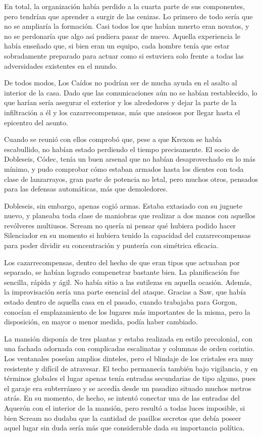 En total, la organización había perdido a la cuarta parte de sus componentes, pero tendrían que aprender a surgir de las cenizas. Lo primero de todo sería que no se ampliaría la formación. Casi todos los que habían muerto eran novatos, y no se perdonaría que algo así pudiera pasar de nuevo. Aquella experiencia le había enseñado que, si bien eran un equipo, cada hombre tenía que estar sobradamente preparado para actuar como si estuviera solo frente a todas las adversidades existentes en el mundo.

De todos modos, Los Caídos no podrían ser de mucha ayuda en el asalto al interior de la casa. Dado que las comunicaciones aún no se habían restablecido, lo que harían sería asegurar el exterior y los alrededores y dejar la parte de la infiltración a él y los cazarrecompensas, más que ansiosos por llegar hasta el epicentro del asunto.

Cuando se reunió con ellos comprobó que, pese a que Krexon se había escabullido, no habían estado perdiendo el tiempo precisamente. El socio de Dobleseis, Códec, tenía un buen arsenal que no habían desaprovechado en lo más mínimo, y pudo comprobar cómo estaban armados hasta los dientes con toda clase de lanzarrayos, gran parte de potencia no letal, pero muchos otros, pensados para las defensas automáticas, más que demoledores.

Dobleseis, sin embargo, apenas cogió armas. Estaba extasiado con su juguete nuevo, y planeaba toda clase de maniobras que realizar a dos manos con aquellos revólveres multiusos. Scream no quería ni pensar qué hubiera podido hacer Silenciador en su momento si hubiera tenido la capacidad del cazarrecompensas para poder dividir su concentración y puntería con simétrica eficacia.

Los cazarrecompensas, dentro del hecho de que eran tipos que actuaban por separado, se habían logrado compenetrar bastante bien. La planificación fue sencilla, rápida y ágil. No había sitio a las sutilezas en aquella ocasión. Además, la improvisación sería una parte esencial del ataque. Gracias a Saw, que había estado dentro de aquella casa en el pasado, cuando trabajaba para Gorgon, conocían el emplazamiento de los lugares más importantes de la misma, pero la disposición, en mayor o menor medida, podía haber cambiado.

La mansión disponía de tres plantas y estaba realizada en estilo precolonial, con una fachada adornada con complicadas escalinatas y columnas de orden corintio. Los ventanales poseían amplios dinteles, pero el blindaje de los cristales era muy resistente y difícil de atravesar. El techo permanecía también bajo vigilancia, y en términos globales el lugar apenas tenía entradas secundarias de tipo alguno, pues el garaje era subterráneo y se accedía desde un pasadizo situado muchos metros atrás. En su momento, de hecho, se intentó conectar una de las entradas del Aquerón con el interior de la mansión, pero resultó a todas luces imposible, si bien Scream no dudaba que la cantidad de pasillos secretos que debía poseer aquel lugar sin duda sería más que considerable dada su importancia política.

